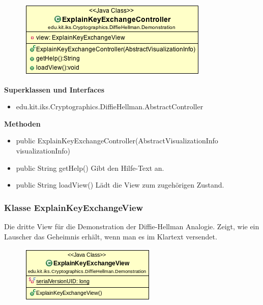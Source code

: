 \documentclass{article}
\begin{document}
      \begin{figure}[H]
        \centering
        \includegraphics{resources/edu-kit-iks-Cryptographics-DiffieHellman-Demonstration-ExplainKeyExchangeController}
      \end{figure}

      \textbf{Superklassen und Interfaces}
      \begin{itemize}
        \item edu.kit.iks.Cryptographics.DiffieHellman.AbstractController
      \end{itemize}

      \textbf{Methoden}
      \begin{itemize}
          \item public ExplainKeyExchangeController(AbstractVisualizationInfo visualizationInfo)
        \item public String getHelp() \newline
        Gibt den Hilfe-Text an.
        \item public String loadView() \newline
        Lädt die View zum zugehörigen Zustand.
      \end{itemize}

\subsubsection{Klasse ExplainKeyExchangeView}
      Die dritte View für die Demonstration der Diffie-Hellman Analogie.
      Zeigt, wie ein Lauscher das Geheimnis erhält, wenn man es
      im Klartext versendet.

      \begin{figure}[H]
        \centering
        \includegraphics{resources/edu-kit-iks-Cryptographics-DiffieHellman-Demonstration-ExplainKeyExchangeView}
      \end{figure}
\end{document}
